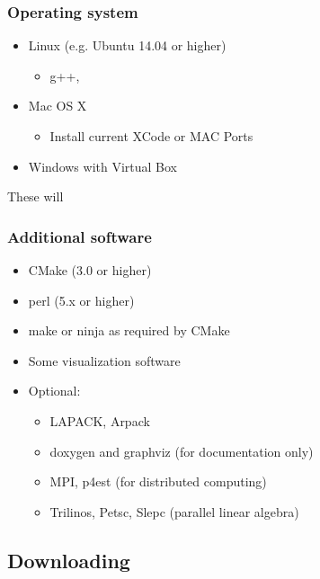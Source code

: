 \begin{frame}
  \frametitle{Operating system}
  \begin{itemize}
  \item Linux (e.g. Ubuntu 14.04 or higher)
    \begin{itemize}
    \item g++, 
    \end{itemize}
  \item Mac OS X
    \begin{itemize}
    \item Install current XCode or MAC Ports
    \end{itemize}
  \item Windows with Virtual Box
  \end{itemize}
  These will 
\end{frame}

\begin{frame}
  \frametitle{Additional software}
  \begin{itemize}
  \item CMake (3.0 or higher)
  \item perl (5.x or higher)
     \item make or ninja as required by CMake
  \item Some visualization software
    \item Optional: 
    \begin{itemize}
    \item LAPACK, Arpack
    \item doxygen and graphviz (for documentation only)
    \item MPI, p4est (for distributed computing)
    \item Trilinos, Petsc, Slepc (parallel linear algebra)
    \end{itemize}
  \end{itemize}
\end{frame}

\subsection{Downloading}

